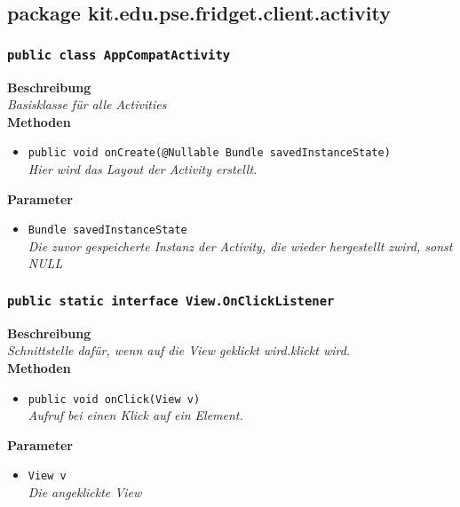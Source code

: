 \subsection{package kit.edu.pse.fridget.client.activity}
\subsubsection{\texttt{public class AppCompatActivity}}

	\textbf{Beschreibung} \\
	\textit{Basisklasse für alle Activities} \\

	\textbf{Methoden}
	\begin{itemize}
		\item{\texttt{public void onCreate(@Nullable Bundle savedInstanceState)}}\\
	\textit{Hier wird das Layout der Activity erstellt.}\\
	\end{itemize}

	\textbf{Parameter}
	\begin{itemize}
		\item\texttt{Bundle savedInstanceState}\\ 
	\textit{Die zuvor gespeicherte Instanz der Activity, die wieder hergestellt zwird, sonst NULL}\\
	\end{itemize}

\subsubsection{\texttt{public static interface View.OnClickListener}}

	\textbf{Beschreibung} \\
	\textit{Schnittstelle dafür, wenn auf die View geklickt wird.klickt wird.}\\

	\textbf{Methoden}
	\begin{itemize}
	\item{\texttt{public void onClick(View v)}}\\
	\textit{Aufruf bei einen Klick auf ein Element.}\\
	\end{itemize}

	\textbf{Parameter}
	\begin{itemize}
	\item\texttt{View v}\\
	\textit{Die angeklickte View}\\
	\end{itemize} 

